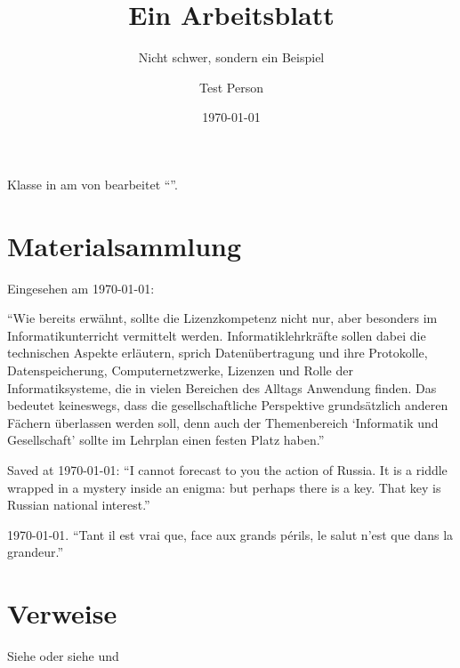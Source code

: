 \documentclass[]{scrartcl}
\author{Test Person}
\date{\today}
\title{Ein Arbeitsblatt}
\subtitle{Nicht schwer, sondern ein Beispiel}
\begin{document}
\maketitle

Klasse \Kurs in \Fach am \Datum von \Autor bearbeitet \enquote{\Titel}.


\section{Materialsammlung}

    Eingesehen am \today:

        \enquote{Wie bereits erwähnt, sollte die Lizenzkompetenz nicht nur, aber besonders im Informatikunterricht vermittelt werden. Informatiklehrkräfte sollen dabei die technischen Aspekte erläutern, sprich Datenübertragung und ihre Protokolle, Datenspeicherung, Computernetzwerke, Lizenzen und Rolle der Informatiksysteme, die in vielen Bereichen des Alltags Anwendung finden. Das bedeutet keineswegs, dass die gesellschaftliche Perspektive grundsätzlich anderen Fächern überlassen werden soll, denn auch der Themenbereich \enquote{Informatik und Gesellschaft} sollte im Lehrplan einen festen Platz haben.}\autocite[29]{Salamon2013}

    \begin{otherlanguage}{english}
        Saved at \today:
        \enquote{I cannot forecast to you the action of Russia. It is a riddle wrapped in a mystery inside an enigma: but perhaps there is a key. That key is Russian national interest.}
    \end{otherlanguage}

\begin{otherlanguage}{french}
	\today.
	\enquote{Tant il est vrai que, face aux grands périls, le salut n'est que dans la grandeur.}
\end{otherlanguage}

\clearpage
{}
\begin{zeilenNrZweispaltig}
	\blindtext
\end{zeilenNrZweispaltig}

	\blindtext

 \blindtext
\section{Verweise}
Siehe  oder siehe  und 

\printbibliography
\end{document}
